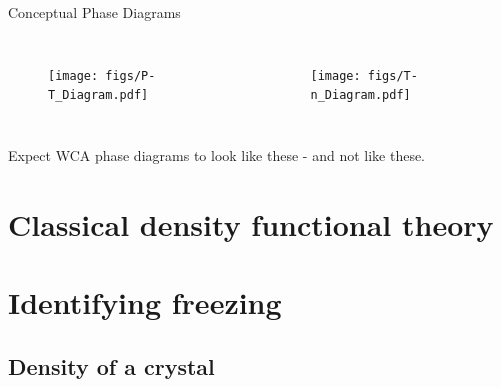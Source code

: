\documentclass{beamer}
\begin{document}


\begin{frame}{Conceptual Phase Diagrams}
	\begin{columns}[t]
        \begin{figure}
            \centering
            \texttt{[image: figs/P-T\_Diagram.pdf]}
          \end{figure}
		 \begin{figure}
            \centering
            \texttt{[image: figs/T-n\_Diagram.pdf]}
          \end{figure}
	\end{columns}
    \vspace{+1em}
Expect WCA phase diagrams to look like these - and not like these.	
\end{frame}

 
\section*{Classical density functional theory}
\section*{Identifying freezing}
\subsection*{Density of a crystal}
\end{document}
